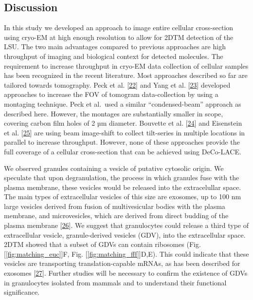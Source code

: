 \documentclass[
]{article}
\begin{document}
\hypertarget{discussion}{%
\subsection{Discussion}\label{discussion}}

In this study we developed an approach to image entire cellular
cross-section using cryo-EM at high enough resolution to allow for 2DTM
detection of the LSU. The two main advantages compared to previous
approaches are high throughput of imaging and biological context for
detected molecules. The requirement to increase throughput in cryo-EM
data collection of cellular samples has been recognized in the recent
literature. Most approaches described so far are tailored towards
tomography. Peck et al. {[}\protect\hyperlink{ref-1GPPSX111}{22}{]} and Yang et al.
{[}\protect\hyperlink{ref-ujizcpVn}{23}{]} developed approaches to increase the
FOV of tomogram data-collection by using a montaging technique. Peck et
al.~used a similar ``condensed-beam'' approach as described here. However,
the montages are substantially smaller in scope, covering carbon film
holes of 2 µm diameter. Bouvette et al.
{[}\protect\hyperlink{ref-1Gwx5ScUa}{24}{]} and Eisenstein et al.
{[}\protect\hyperlink{ref-xvouNMBy}{25}{]} are using beam image-shift to collect
tilt-series in multiple locations in parallel to increase throughput.
However, none of these approaches provide the full coverage of a
cellular cross-section that can be achieved using DeCo-LACE.

We observed granules containing a vesicle of putative cytosolic origin.
We speculate that upon degranulation, the process in which granules fuse
with the plasma membrane, these vesicles would be released into the
extracelullar space. The main types of extracellular vesicles of this
size are exosomes, up to 100 nm large vesicles derived from fusion of
multivesicular bodies with the plasma membrane, and microvesicles, which
are derived from direct budding of the plasma membrane
{[}\protect\hyperlink{ref-kncnYGLD}{26}{]}. We suggest that granulocytes could release
a third type of extracellular vesicle, granule-derived vesicles (GDV),
into the extracellular space. 2DTM showed that a subset of GDVs can
contain ribosomes (Fig. {[}\ref{fig:matching_euc}{]}F, Fig.
{[}\ref{fig:matching_fff}{]}D,E). This could indicate that these vesicles are
transporting translation-capable mRNAs, as has been described for
exosomes {[}\protect\hyperlink{ref-agVdpX76}{27}{]}. Further studies will be necessary to
confirm the existence of GDVs in granulocytes isolated from mammals and
to understand their functional significance.
\end{document}
